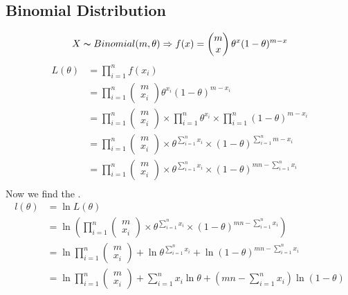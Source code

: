 \subsection{Binomial Distribution}
\[X \thicksim Binomial(m, \theta) \Rightarrow f(x) =\begin{pmatrix}
		m \\ x
	\end{pmatrix}\theta^x(1 - \theta)^{m-x}\]
\[\begin{split}
		L(\theta) &= \prod_{i=1}^n f(x_i) \\
		&= \prod_{i=1}^n \begin{pmatrix}
			m \\ x_i
		\end{pmatrix}\theta^{x_i}(1 - \theta)^{m-x_i} \\
		&= \prod_{i=1}^n \begin{pmatrix}
			m \\ x_i
		\end{pmatrix} \times \prod_{i=1}^n\theta^{x_i} \times \prod_{i=1}^n(1 - \theta)^{m-x_i} \\
		&= \prod_{i=1}^n \begin{pmatrix}
			m \\ x_i
		\end{pmatrix} \times \theta^{\sum_{i=1}^nx_i} \times (1 - \theta)^{\sum_{i=1}^n m - x_i} \\
		&= \prod_{i=1}^n \begin{pmatrix}
			m \\ x_i
		\end{pmatrix} \times \theta^{\sum_{i=1}^nx_i} \times (1 - \theta)^{mn - \sum_{i=1}^n x_i} \\
	\end{split}\]
Now we find the .
\[\begin{split}
		l(\theta) &= \ln L(\theta) \\
		&= \ln \left( \prod_{i=1}^n \begin{pmatrix}
			m \\ x_i
		\end{pmatrix} \times \theta^{\sum_{i=1}^nx_i} \times (1 - \theta)^{mn - \sum_{i=1}^n x_i} \right) \\
		&= \ln \prod_{i=1}^n \begin{pmatrix}
			m \\ x_i
		\end{pmatrix} + \ln \theta^{\sum_{i=1}^nx_i} + \ln (1 - \theta)^{mn - \sum_{i=1}^n x_i} \\
		&= \ln \prod_{i=1}^n \begin{pmatrix}
			m \\ x_i
		\end{pmatrix} + \sum_{i=1}^nx_i\ln \theta + \left( mn - \sum_{i=1}^n x_i \right)\ln (1 - \theta) \\
	\end{split}\]
